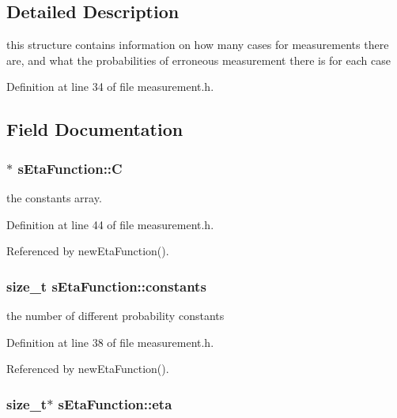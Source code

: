 \subsection{\-Detailed \-Description}
this structure contains information on how many cases for measurements there are, and what the probabilities of erroneous measurement there is for each case 

\-Definition at line 34 of file measurement.\-h.



\subsection{\-Field \-Documentation}
\hypertarget{structsEtaFunction_a05c2f93c1148d5268d359d78540c10be}{
\subsubsection[{\-C}]{$\ast$ {\bf s\-Eta\-Function\-::\-C}}}\label{structsEtaFunction_a05c2f93c1148d5268d359d78540c10be}


the constants array. 



\-Definition at line 44 of file measurement.\-h.



\-Referenced by new\-Eta\-Function().

\hypertarget{structsEtaFunction_a1fdf63f3a73e7fd663491e72421619f9}{
\subsubsection[{constants}]{\setlength{\rightskip}{0pt plus 5cm}size\-\_\-t {\bf s\-Eta\-Function\-::constants}}}\label{structsEtaFunction_a1fdf63f3a73e7fd663491e72421619f9}


the number of different probability constants 



\-Definition at line 38 of file measurement.\-h.



\-Referenced by new\-Eta\-Function().

\hypertarget{structsEtaFunction_a7585a59b1861523157055f8c8b0263e3}{
\subsubsection[{eta}]{\setlength{\rightskip}{0pt plus 5cm}size\-\_\-t$\ast$ {\bf s\-Eta\-Function\-::eta}}}\label{structsEtaFunction_a7585a59b1861523157055f8c8b0263e3}


